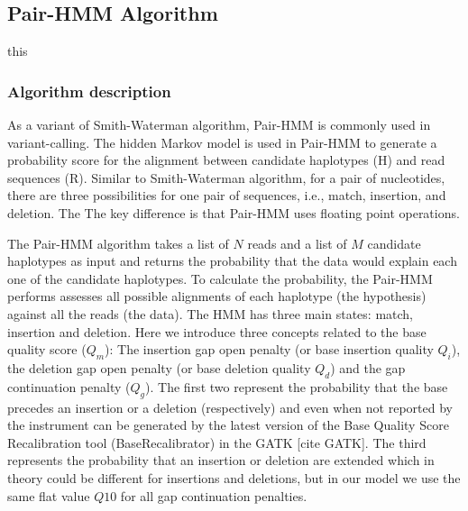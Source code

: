 \subsection{Pair-HMM Algorithm}
this
\subsubsection{Algorithm description}
As a variant of Smith-Waterman algorithm, Pair-HMM is commonly used in variant-calling. The hidden Markov model is used in Pair-HMM to generate a probability score for the alignment between candidate haplotypes (H) and read sequences (R). Similar to Smith-Waterman algorithm, for a pair of nucleotides, there are three possibilities for one pair of sequences, i.e., match, insertion, and deletion. The The key difference is that Pair-HMM uses floating point operations.

The Pair-HMM algorithm takes a list of $N$ reads and a list of $M$ candidate haplotypes as input and returns the probability that the data would explain each one of the candidate haplotypes. To calculate the probability, the Pair-HMM performs assesses all possible alignments of each haplotype (the hypothesis) against all the reads (the data). The HMM has three main states: match, insertion and deletion. Here we introduce three concepts related to the base quality score ($Q_m$): The insertion gap open penalty (or base insertion quality $Q_i$), the deletion gap open penalty (or base deletion quality $Q_d$) and the gap continuation penalty ($Q_g$). The first two represent the probability that the base precedes an insertion or a deletion (respectively) and even when not reported by the instrument can be generated by the latest version of the Base Quality Score Recalibration tool (BaseRecalibrator) in the GATK [cite GATK]. The third represents the probability that an insertion or deletion are extended which in theory could be different for insertions and deletions, but in our model we use the same flat value $Q10$ for all gap continuation penalties.

